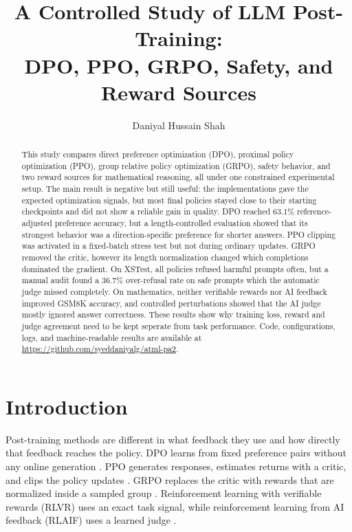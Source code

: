 \documentclass{article}
\title{A Controlled Study of LLM Post-Training:\\
DPO, PPO, GRPO, Safety, and Reward Sources}
\author{Daniyal Hussain Shah}
\begin{document}
\maketitle

\begin{abstract}
This study compares direct preference optimization (DPO), proximal policy optimization (PPO), group relative policy optimization (GRPO), safety behavior, and two reward sources for mathematical reasoning, all under one constrained experimental setup. The main result is negative but still useful: the implementations gave the expected optimization signals, but most final policies stayed close to their starting checkpoints and did not show a reliable gain in quality. DPO reached 63.1\% reference-adjusted preference accuracy, but a length-controlled evaluation showed that its strongest behavior was a direction-specific preference for shorter answers. PPO clipping was activated in a fixed-batch stress test but not during ordinary updates. GRPO removed the critic, however its length normalization changed which completions dominated the gradient. On XSTest, all policies refused harmful prompts often, but a manual audit found a 36.7\% over-refusal rate on safe prompts which the automatic judge missed completely. On mathematics, neither verifiable rewards nor AI feedback improved GSM8K accuracy, and controlled perturbations showed that the AI judge mostly ignored answer correctness. These results show why training loss, reward and judge agreement need to be kept seperate from task performance. Code, configurations, logs, and machine-readable results are available at \url{https://github.com/syeddaniyalg/atml-pa2}.
\end{abstract}

\section{Introduction}
Post-training methods are different in what feedback they use and how directly that feedback reaches the policy. DPO learns from fixed preference pairs without any online generation \citep{rafailov2023dpo}. PPO generates responses, estimates returns with a critic, and clips the policy updates \citep{schulman2017ppo,ouyang2022training}. GRPO replaces the critic with rewards that are normalized inside a sampled group \citep{shao2024deepseekmath}. Reinforcement learning with verifiable rewards (RLVR) uses an exact task signal, while reinforcement learning from AI feedback (RLAIF) uses a learned judge \citep{bai2022constitutional,lee2024rlaif}.
\end{document}
